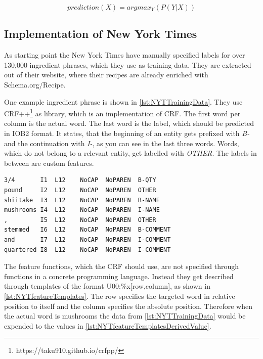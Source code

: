 \documentclass[12pt, twoside]{report}
\begin{document}
\begin{equation}\label{eq:CRF}
prediction(X) = argmax_Y(P(Y|X))
\end{equation}

\subsection{Implementation of New York Times}
As starting point the New York Times have manually specified labels for over 130,000 ingredient phrases, which they use as training data. They are extracted out of their website, where their recipes are already enriched with Schema.org/Recipe.

One example ingredient phrase is shown in \cref{lst:NYTTrainingData}. They use CRF++\footnote{https://taku910.github.io/crfpp/} as library, which is an implementation of CRF. The first word per column is the actual word. The last word is the label, which should be predicted in IOB2 format. It states, that the beginning of an entity gets prefixed with \textit{B-} and the continuation with \textit{I-}, as you can see in the last three words. Words, which do not belong to a relevant entity, get labelled with \textit{OTHER}. The labels in between are custom features. 

\begin{lstlisting}[frame=single, caption={Extract of the training data for New York Times CRF}, label=lst:NYTTrainingData]
3/4       I1  L12	 NoCAP	NoPAREN	 B-QTY
pound     I2  L12	 NoCAP	NoPAREN	 OTHER
shiitake  I3  L12	 NoCAP	NoPAREN	 B-NAME
mushrooms I4  L12	 NoCAP	NoPAREN	 I-NAME
,         I5  L12	 NoCAP	NoPAREN	 OTHER
stemmed   I6  L12	 NoCAP	NoPAREN	 B-COMMENT
and       I7  L12	 NoCAP	NoPAREN	 I-COMMENT
quartered I8  L12	 NoCAP	NoPAREN	 I-COMMENT
\end{lstlisting}

The feature functions, which the CRF should use, are not specified through functions in a concrete programming language. Instead they get described through templates of the format U00:\%x[row,column], as shown in \cref{lst:NYTfeatureTemplates}. The row specifies the targeted word in relative position to itself and the column specifies the absolute position. Therefore when the actual word is mushrooms the data from \cref{lst:NYTTrainingData} would be expended to the values in \cref{lst:NYTfeatureTemplatesDerivedValue}.
\end{document}
